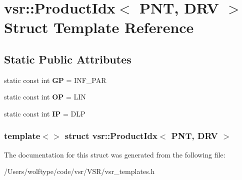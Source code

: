 \hypertarget{structvsr_1_1_product_idx_3_01_p_n_t_00_01_d_r_v_01_4}{\section{vsr\-:\-:Product\-Idx$<$ P\-N\-T, D\-R\-V $>$ Struct Template Reference}
\label{structvsr_1_1_product_idx_3_01_p_n_t_00_01_d_r_v_01_4}
}
\subsection*{Static Public Attributes}
\begin{DoxyCompactItemize}
\item 
\hypertarget{structvsr_1_1_product_idx_3_01_p_n_t_00_01_d_r_v_01_4_ac6088e313da57933c223142922b8bd75}{static const int {\bfseries G\-P} = I\-N\-F\-\_\-\-P\-A\-R}\label{structvsr_1_1_product_idx_3_01_p_n_t_00_01_d_r_v_01_4_ac6088e313da57933c223142922b8bd75}

\item 
\hypertarget{structvsr_1_1_product_idx_3_01_p_n_t_00_01_d_r_v_01_4_aff168299b9d40b9b2c824286230e10b7}{static const int {\bfseries O\-P} = L\-I\-N}\label{structvsr_1_1_product_idx_3_01_p_n_t_00_01_d_r_v_01_4_aff168299b9d40b9b2c824286230e10b7}

\item 
\hypertarget{structvsr_1_1_product_idx_3_01_p_n_t_00_01_d_r_v_01_4_acab9bac2d5ce1fe737b06867adffaef0}{static const int {\bfseries I\-P} = D\-L\-P}\label{structvsr_1_1_product_idx_3_01_p_n_t_00_01_d_r_v_01_4_acab9bac2d5ce1fe737b06867adffaef0}

\end{DoxyCompactItemize}
\subsubsection*{template$<$$>$ struct vsr\-::\-Product\-Idx$<$ P\-N\-T, D\-R\-V $>$}



The documentation for this struct was generated from the following file\-:\begin{DoxyCompactItemize}
\item 
/\-Users/wolftype/code/vsr/\-V\-S\-R/vsr\-\_\-templates.\-h\end{DoxyCompactItemize}
